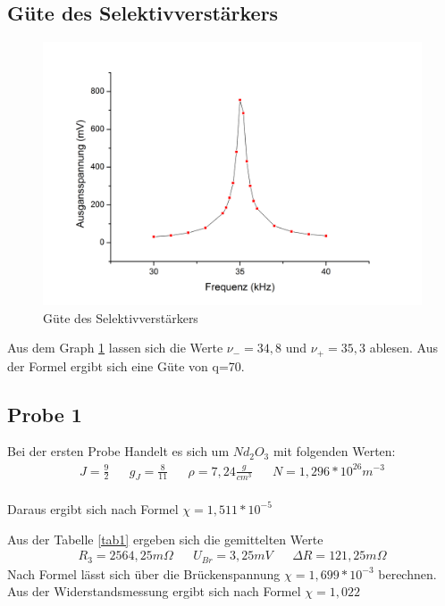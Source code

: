 \subsection{Güte des Selektivverstärkers}

\begin{figure}[h]
		\begin{center}
		\includegraphics[scale=0.4]{gute.jpg}
		\caption{Güte des Selektivverstärkers}
		\label{gute}
		\end{center}	
\end{figure}

Aus dem Graph \ref{gute} lassen sich die Werte $\nu_-=34,8$ und $\nu_+=35,3$ ablesen. Aus der Formel ergibt sich eine Güte von q=70.

\subsection{Probe 1}
Bei der ersten Probe Handelt es sich um $Nd_2O_3$ mit folgenden Werten:
\begin{align*}
&J=\frac92&
&g_J=\frac{8}{11}&
&\rho=7,24\frac{g}{cm^3}&
&N=1,296*10^{26}m^{-3}&
\end{align*}
\\
Daraus ergibt sich nach Formel 
$\chi=1,511*10^{-5}$

Aus der Tabelle \ref{tab1} ergeben sich die gemittelten Werte
\begin{align*}
&R_3=2564,25m\Omega&
&U_{Br}=3,25mV&
&\Delta R=121,25m\Omega&
\end{align*}
Nach Formel lässt sich über die Brückenspannung
$\chi=1,699*10^{-3}$
berechnen.
\\
Aus der Widerstandsmessung ergibt sich nach Formel
$\chi=1,022$


